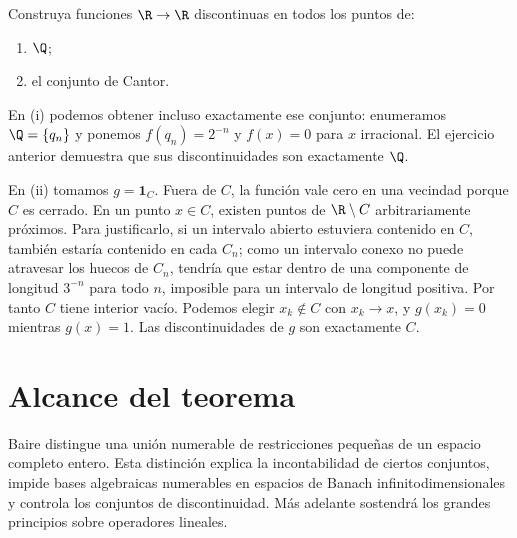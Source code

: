 \begin{ejercicio}
Construya funciones $\R\to\R$ discontinuas en todos los puntos de: \begin{enumerate}[label=(\roman*)]\item $\Q$;\item el conjunto de Cantor.\end{enumerate}
\end{ejercicio}
\begin{solucion}
En (i) podemos obtener incluso exactamente ese conjunto: enumeramos $\Q=\{q_n\}$ y ponemos $f(q_n)=2^{-n}$ y $f(x)=0$ para $x$ irracional. El ejercicio anterior demuestra que sus discontinuidades son exactamente $\Q$.

En (ii) tomamos $g=\mathbf1_C$. Fuera de $C$, la función vale cero en una vecindad porque $C$ es cerrado. En un punto $x\in C$, existen puntos de $\R\setminus C$ arbitrariamente próximos. Para justificarlo, si un intervalo abierto estuviera contenido en $C$, también estaría contenido en cada $C_n$; como un intervalo conexo no puede atravesar los huecos de $C_n$, tendría que estar dentro de una componente de longitud $3^{-n}$ para todo $n$, imposible para un intervalo de longitud positiva. Por tanto $C$ tiene interior vacío. Podemos elegir $x_k\notin C$ con $x_k\to x$, y $g(x_k)=0$ mientras $g(x)=1$. Las discontinuidades de $g$ son exactamente $C$.
\end{solucion}

\section{Alcance del teorema}
Baire distingue una unión numerable de restricciones pequeñas de un espacio completo entero. Esta distinción explica la incontabilidad de ciertos conjuntos, impide bases algebraicas numerables en espacios de Banach infinitodimensionales y controla los conjuntos de discontinuidad. Más adelante sostendrá los grandes principios sobre operadores lineales.
